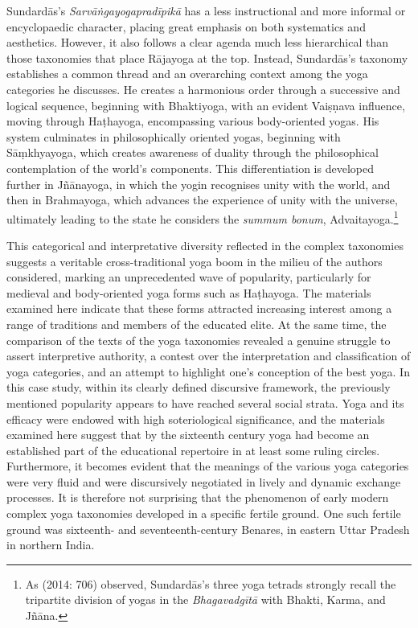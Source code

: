 Sundardās's \textit{Sarvāṅgayogapradīpikā} has a less instructional and more informal or encyclopaedic character, placing great emphasis on both systematics and aesthetics. However, it also follows a clear agenda much less hierarchical than those taxonomies that place Rājayoga at the top. Instead, Sundardās's taxonomy establishes a common thread and an overarching context among the yoga categories he discusses. He creates a harmonious order through a successive and logical sequence, beginning with Bhaktiyoga, with an evident Vaiṣṇava influence, moving through Haṭhayoga, encompassing various body-oriented yogas. His system culminates in philosophically oriented yogas, beginning with Sāṃkhyayoga, which creates awareness of duality through the philosophical contemplation of the world's components. This differentiation is developed further in Jñānayoga, in which the yogin recognises unity with the world, and then in Brahmayoga, which advances the experience of unity with the universe, ultimately leading to the state he considers the \textit{summum bonum}, Advaitayoga.\footnote{As \citeauthor{burger2014sarvangayogapradipika} (2014: 706) observed, Sundardās's three yoga tetrads strongly recall the tripartite division of yogas in the \emph{Bhagavadgītā} with Bhakti, Karma, and Jñāna.}

This categorical and interpretative diversity reflected in the complex taxonomies suggests a veritable cross-traditional yoga boom in the milieu of the authors considered, marking an unprecedented wave of popularity, particularly for medieval and body-oriented yoga forms such as Haṭhayoga. The materials examined here indicate that these forms attracted increasing interest among a range of traditions and members of the educated elite. At the same time, the comparison of the texts of the yoga taxonomies revealed a genuine struggle to assert interpretive authority, a contest over the interpretation and classification of yoga categories, and an attempt to highlight one's conception of the best yoga.
In this case study, within its clearly defined discursive framework, the previously mentioned popularity appears to have reached several social strata. Yoga and its efficacy were endowed with high soteriological significance, and the materials examined here suggest that by the sixteenth century yoga had become an established part of the educational repertoire in at least some ruling circles. Furthermore, it becomes evident that the meanings of the various yoga categories were very fluid and were discursively negotiated in lively and dynamic exchange processes. It is therefore not surprising that the phenomenon of early modern complex yoga taxonomies developed in a specific fertile ground. One such fertile ground was sixteenth- and seventeenth-century Benares, in eastern Uttar Pradesh in northern India.

